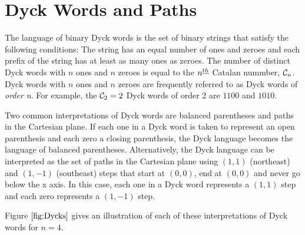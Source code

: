 \section{Dyck Words and Paths} \label{sec:Dycks}

The language of binary Dyck words is the set of binary strings that satisfy the following conditions: The string has an equal number of ones and zeroes and each prefix of the string has at least as many ones as zeroes.  The number of distinct Dyck words with $n$ ones and $n$ zeroes is equal to the $n^{\underline{th}}$ Catalan nummber, $\mathcal{C}_n$.  Dyck words with $n$ ones and $n$ zeroes are frequently referred to as Dyck words of \emph{order n}.
For example, the $\mathcal{C}_2=2$ Dyck words of order 2 are $1100$ and $1010$.

Two common interpretations of Dyck words are balanced parentheses and paths in the Cartesian plane. If each one in a Dyck word is taken to represent an open parenthesis and each zero a closing parenthesis, the Dyck language becomes the language of balanced parentheses.  Alternatively, the Dyck language can be interpreted as the set of paths in the Cartesian plane using $(1,1)$ (northeast) and $(1,-1)$ (southeast) steps that start at $(0,0)$, end at $(0,0)$ and never go below the x axis. In this case, each one in a Dyck word represents a $(1,1)$ step and each zero represents a $(1,-1)$ step.

Figure $\ref{fig:Dycks}$ gives an illustration of each of these interpretations of Dyck words for $n=4$.


